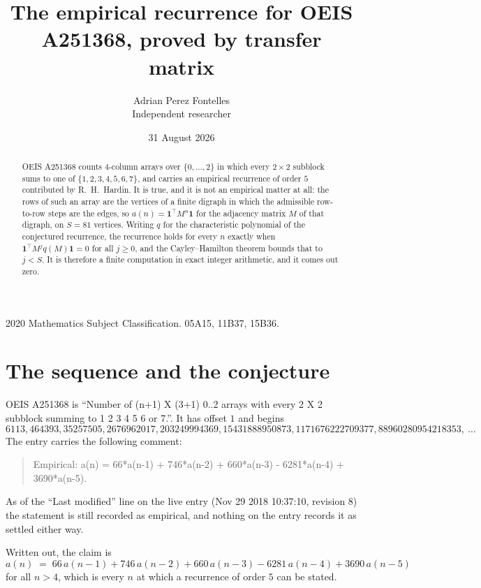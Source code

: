 \documentclass[11pt,a4paper]{article}
\title{The empirical recurrence for OEIS A251368, proved by transfer matrix}
\author{Adrian Perez Fontelles\\ \small Independent researcher}
\date{31 August 2026}
\theoremstyle{plain}
\theoremstyle{definition}
\begin{document}
\maketitle

\begin{abstract}
OEIS A251368 counts $4$-column arrays over $\{0,\dots,2\}$ in which every
$2\times2$ subblock sums to one of $\{1, 2, 3, 4, 5, 6, 7\}$, and carries an empirical
recurrence of order $5$ contributed by R.~H.~Hardin. It is true, and it is not an
empirical matter at all: the rows of such an array are the vertices of a finite digraph in
which the admissible row-to-row steps are the edges, so $a(n)=\mathbf{1}^{\!\top}M^{n}
\mathbf{1}$ for the adjacency matrix $M$ of that digraph, on $S=81$ vertices. Writing
$q$ for the characteristic polynomial of the conjectured recurrence, the recurrence holds
for every $n$ exactly when $\mathbf{1}^{\!\top}M^{j}q(M)\mathbf{1}=0$ for all
$j\ge0$, and the Cayley--Hamilton theorem bounds that to $j<S$. It is therefore a finite
computation in exact integer arithmetic, and it comes out zero.
\end{abstract}

\noindent\small 2020 Mathematics Subject Classification. 05A15, 11B37, 15B36.\normalsize

\section{The sequence and the conjecture}

OEIS A251368 is ``Number of (n+1) X (3+1) 0..2 arrays with every 2 X 2 subblock summing to 1 2 3 4 5 6 or 7.''. It has offset $1$
and begins
\[
6113, 464393, 35257505, 2676962017, 203249994369, 15431888950873, 1171676222709377, 88960280954218353,\ \dots
\]
The entry carries the following comment:
\begin{quote}\small
Empirical: a(n) = 66*a(n-1) + 746*a(n-2) + 660*a(n-3) - 6281*a(n-4) + 3690*a(n-5).
\end{quote}
As of the ``Last modified'' line on the live entry (Nov 29 2018 10:37:10, revision 8) the statement is
still recorded as empirical, and nothing on the entry records it as settled either way.

Written out, the claim is
\begin{equation}\label{eq:conj}
a(n)\;=\;66\,a(n-1) + 746\,a(n-2) + 660\,a(n-3) - 6281\,a(n-4) + 3690\,a(n-5)
\end{equation}
for all $n>4$, which is every $n$ at which a recurrence of order $5$ can be
stated.
\end{document}
